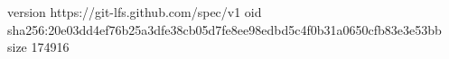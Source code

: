 version https://git-lfs.github.com/spec/v1
oid sha256:20e03dd4ef76b25a3dfe38cb05d7fe8ee98edbd5c4f0b31a0650cfb83e3e53bb
size 174916
